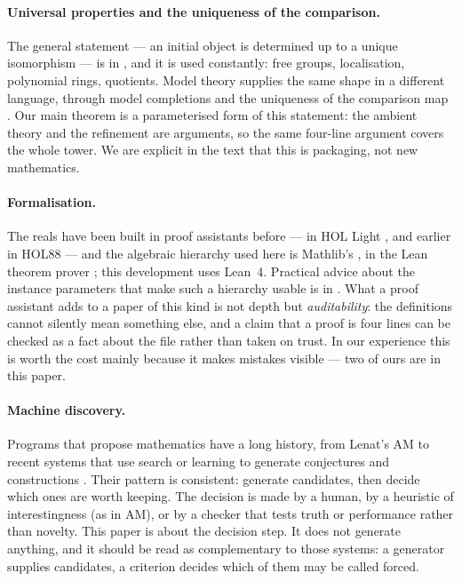 \documentclass[aps,prd,preprint,superscriptaddress,amsmath,amssymb]{revtex4-2}
\begin{document}
\paragraph{Universal properties and the uniqueness of the comparison.}
The general statement --- an initial object is determined up to a unique
isomorphism --- is in \cite{MacLane1971}, and it is used constantly: free groups,
localisation, polynomial rings, quotients.  Model theory supplies the same shape
in a different language, through model completions and the uniqueness of the
comparison map \cite{EklofSabbagh1971,Hodges1993}.  Our main theorem is a
parameterised form of this statement: the ambient theory and the refinement are
arguments, so the same four-line argument covers the whole tower.  We are explicit
in the text that this is packaging, not new mathematics.

\paragraph{Formalisation.}
The reals have been built in proof assistants before --- in HOL Light
\cite{Harrison1998}, and earlier in HOL88 --- and the algebraic hierarchy used
here is Mathlib's \cite{mathlib}, in the Lean theorem prover \cite{lean}; this
development uses Lean~4.  Practical advice about the instance
parameters that make such a hierarchy usable is in \cite{Baanen2022}.  What a
proof assistant adds to a paper of this kind is not depth but \emph{auditability}:
the definitions cannot silently mean something else, and a claim that a proof is
four lines can be checked as a fact about the file rather than taken on trust.
In our experience this is worth the cost mainly because it makes mistakes visible
--- two of ours are in this paper.

\paragraph{Machine discovery.}
Programs that propose mathematics have a long history, from Lenat's
\textsc{AM} \cite{lenat1976} to recent systems that use search or learning to
generate conjectures and constructions \cite{davies2021,raayoni2021,romera2024}.
Their pattern is consistent: generate candidates, then decide which ones are
worth keeping.  The decision is made by a human, by a heuristic of interestingness
(as in \textsc{AM}), or by a checker that tests truth or performance rather than
novelty.  This paper is about the decision step.  It does
not generate anything, and it should be read as complementary to those systems: a
generator supplies candidates, a criterion decides which of them may be called
forced.
\end{document}
